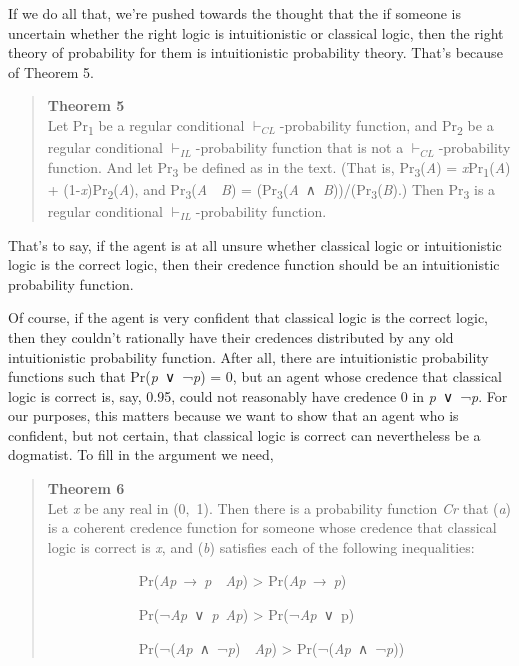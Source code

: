 \documentclass[
  11pt,
  letterpaper,
  DIV=11,
  numbers=noendperiod,
  twoside]{scrartcl}
\begin{document}
If we do all that, we're pushed towards the thought that the if someone
is uncertain whether the right logic is intuitionistic or classical
logic, then the right theory of probability for them is intuitionistic
probability theory. That's because of Theorem 5.

\begin{quote}
\textbf{Theorem 5}\\
Let Pr\textsubscript{1} be a regular conditional
\(\vdash_{CL}\)-probability function, and Pr\textsubscript{2} be a
regular conditional \(\vdash_{IL}\)-probability function that is not a
\(\vdash_{CL}\)-probability function. And let Pr\textsubscript{3} be
defined as in the text. (That is, Pr\textsubscript{3}(\emph{A}) =
\emph{x}Pr\textsubscript{1}(\emph{A}) +
(1-\emph{x})Pr\textsubscript{2}(\emph{A}), and
Pr\textsubscript{3}(\emph{A}~\textbar~\emph{B}) =
(Pr\textsubscript{3}(\emph{A}~∧~\emph{B}))/(Pr\textsubscript{3}(\emph{B}).)
Then Pr\textsubscript{3} is a regular conditional
\(\vdash_{IL}\)-probability function.
\end{quote}

That's to say, if the agent is at all unsure whether classical logic or
intuitionistic logic is the correct logic, then their credence function
should be an intuitionistic probability function.

Of course, if the agent is very confident that classical logic is the
correct logic, then they couldn't rationally have their credences
distributed by any old intuitionistic probability function. After all,
there are intuitionistic probability functions such that
Pr(\emph{p}~∨~¬\emph{p}) = 0, but an agent whose credence that classical
logic is correct is, say, 0.95, could not reasonably have credence 0 in
\emph{p}~∨~¬\emph{p}. For our purposes, this matters because we want to
show that an agent who is confident, but not certain, that classical
logic is correct can nevertheless be a dogmatist. To fill in the
argument we need,

\begin{quote}
\textbf{Theorem 6}\\
Let \emph{x} be any real in (0,~1). Then there is a probability function
\emph{Cr} that (\emph{a}) is a coherent credence function for someone
whose credence that classical logic is correct is \emph{x}, and
(\emph{b}) satisfies each of the following inequalities:

~~~~~~~~~~~~~Pr(\emph{Ap}~→~\emph{p}~\textbar~\emph{Ap}) \textgreater{}
Pr(\emph{Ap}~→~\emph{p})\\
\strut ~~~~~~~~~~~~~Pr(¬\emph{Ap}~∨~\emph{p}\textbar~\emph{Ap})
\textgreater{} Pr(¬\emph{Ap}~∨~p)\\
\strut ~~~~~~~~~~~~~Pr(¬(\emph{Ap}~∧~¬\emph{p})~\textbar~\emph{Ap})
\textgreater{} Pr(¬(\emph{Ap}~∧~¬\emph{p}))
\end{quote}
\end{document}
